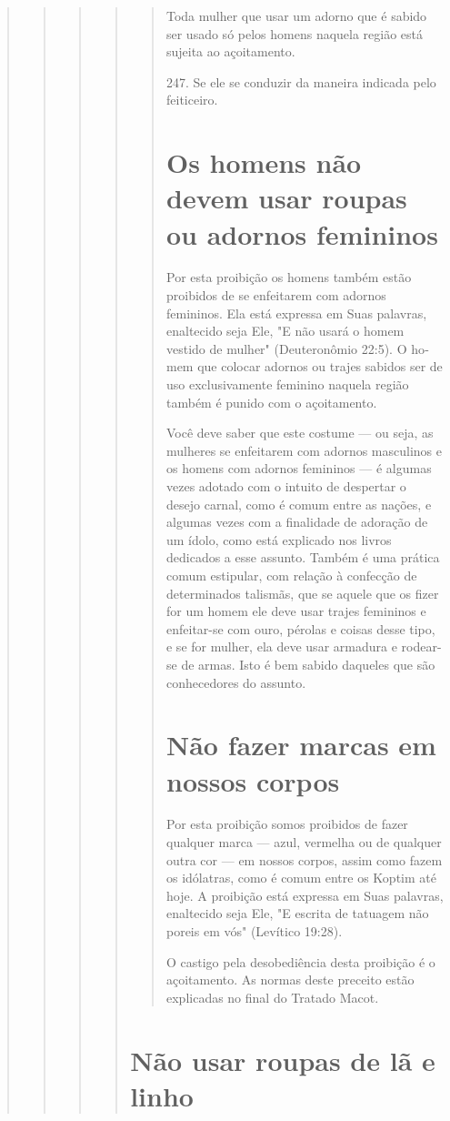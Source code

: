 \begin{quote}
\begin{quote}
\begin{quote}
\begin{quote}
\begin{quote}
Toda mulher que usar um adorno que é sabido ser usado só pelos homens
naquela região está sujeita ao açoitamento.

247. Se ele se conduzir da maneira indicada pelo feiticeiro.


\section{Os homens não devem usar roupas ou adornos femininos}

Por esta proibição os homens também estão proibidos de se enfeita­rem
com adornos femininos. Ela está expressa em Suas palavras, enaltecido
se­ja Ele, "E não usará o homem vestido de mulher" (Deuteronômio 22:5).
O ho­mem que colocar adornos ou trajes sabidos ser de uso exclusivamente
femini­no naquela região também é punido com o açoitamento.

Você deve saber que este costume --- ou seja, as mulheres se enfeita­rem
com adornos masculinos e os homens com adornos femininos --- é algu­mas
vezes adotado com o intuito de despertar o desejo carnal, como é comum
entre as nações, e algumas vezes com a finalidade de adoração de um
ídolo, como está explicado nos livros dedicados a esse assunto. Também é
uma práti­ca comum estipular, com relação à confecção de determinados
talismãs, que se aquele que os fizer for um homem ele deve usar trajes
femininos e enfeitar-se com ouro, pérolas e coisas desse tipo, e se for
mulher, ela deve usar armadu­ra e rodear-se de armas. Isto é bem sabido
daqueles que são conhecedores do assunto.

\section{Não fazer marcas em nossos corpos}

Por esta proibição somos proibidos de fazer qualquer marca --- azul,
vermelha ou de qualquer outra cor --- em nossos corpos, assim como fazem
os idólatras, como é comum entre os Koptim até hoje. A proibição está
expres­sa em Suas palavras, enaltecido seja Ele, "E escrita de tatuagem
não poreis em vós" (Levítico 19:28).

O castigo pela desobediência desta proibição é o açoitamento. As normas
deste preceito estão explicadas no final do Tratado Macot.
\end{quote}

\section{Não usar roupas de lã e linho}


\end{quote}
\end{quote}
\end{quote}
\end{quote}
